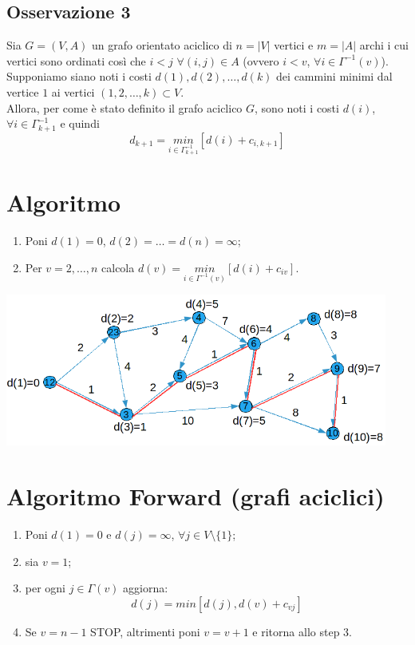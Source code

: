 \subsection{Osservazione 3}
Sia $G=(V,A)$ un grafo orientato aciclico di $n=|V|$ vertici e $m=|A|$ archi i cui vertici sono ordinati così che $i<j$ $\forall(i,j)\in A$ (ovvero $i<v$, $\forall i\in\Gamma^{-1}(v)$).\\
Supponiamo siano noti i costi $d(1),d(2),\dots,d(k)$ dei cammini minimi dal vertice $1$ ai vertici $(1,2,\dots,k)\subset V$.\\
Allora, per come è stato definito il grafo aciclico $G$, sono noti i costi $d(i)$, $\forall i\in\Gamma^{-1}_{k+1}$ e quindi
\begin{equation*}
	d_{k+1}=\underset{i\in\Gamma^{-1}_{k+1}}{min}[d(i)+c_{i,k+1}]
\end{equation*}

\section{Algoritmo}
\begin{enumerate}
	\item Poni $d(1)=0$, $d(2)=\dots=d(n)=\infty$;
	\item Per $v=2,\dots,n$ calcola $d(v)=\underset{i\in\Gamma^{-1}(v)}{min}[d(i)+c_{iv}]$.
\end{enumerate}
\centerline{\includegraphics[height=5cm]{images/graph38.png}}

\section{Algoritmo Forward (grafi aciclici)}
\begin{enumerate}
	\item Poni $d(1)=0$ e $d(j)=\infty$, $\forall j\in V\setminus\{1\}$;
	\item sia $v=1$;
	\item per ogni $j\in\Gamma(v)$ aggiorna:
	\begin{equation*}
		d(j)=min[d(j),d(v)+c_{vj}]
	\end{equation*}
	\item Se $v=n-1$ STOP, altrimenti poni $v=v+1$ e ritorna allo step 3.
\end{enumerate}

